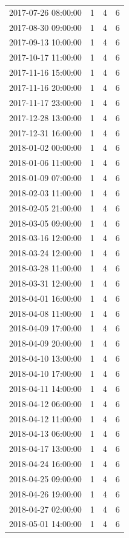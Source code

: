 \begin{tabular}{lrrr}
2017-07-26 08:00:00 & 1 & 4 & 6 \\
2017-08-30 09:00:00 & 1 & 4 & 6 \\
2017-09-13 10:00:00 & 1 & 4 & 6 \\
2017-10-17 11:00:00 & 1 & 4 & 6 \\
2017-11-16 15:00:00 & 1 & 4 & 6 \\
2017-11-16 20:00:00 & 1 & 4 & 6 \\
2017-11-17 23:00:00 & 1 & 4 & 6 \\
2017-12-28 13:00:00 & 1 & 4 & 6 \\
2017-12-31 16:00:00 & 1 & 4 & 6 \\
2018-01-02 00:00:00 & 1 & 4 & 6 \\
2018-01-06 11:00:00 & 1 & 4 & 6 \\
2018-01-09 07:00:00 & 1 & 4 & 6 \\
2018-02-03 11:00:00 & 1 & 4 & 6 \\
2018-02-05 21:00:00 & 1 & 4 & 6 \\
2018-03-05 09:00:00 & 1 & 4 & 6 \\
2018-03-16 12:00:00 & 1 & 4 & 6 \\
2018-03-24 12:00:00 & 1 & 4 & 6 \\
2018-03-28 11:00:00 & 1 & 4 & 6 \\
2018-03-31 12:00:00 & 1 & 4 & 6 \\
2018-04-01 16:00:00 & 1 & 4 & 6 \\
2018-04-08 11:00:00 & 1 & 4 & 6 \\
2018-04-09 17:00:00 & 1 & 4 & 6 \\
2018-04-09 20:00:00 & 1 & 4 & 6 \\
2018-04-10 13:00:00 & 1 & 4 & 6 \\
2018-04-10 17:00:00 & 1 & 4 & 6 \\
2018-04-11 14:00:00 & 1 & 4 & 6 \\
2018-04-12 06:00:00 & 1 & 4 & 6 \\
2018-04-12 11:00:00 & 1 & 4 & 6 \\
2018-04-13 06:00:00 & 1 & 4 & 6 \\
2018-04-17 13:00:00 & 1 & 4 & 6 \\
2018-04-24 16:00:00 & 1 & 4 & 6 \\
2018-04-25 09:00:00 & 1 & 4 & 6 \\
2018-04-26 19:00:00 & 1 & 4 & 6 \\
2018-04-27 02:00:00 & 1 & 4 & 6 \\
2018-05-01 14:00:00 & 1 & 4 & 6 \\

\end{tabular}

